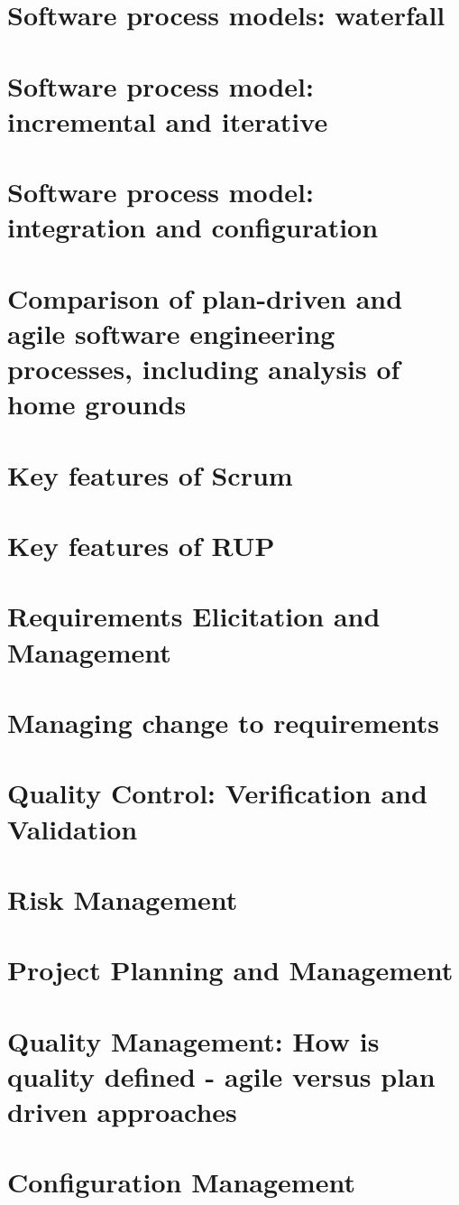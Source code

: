 \documentclass[11pt,a4paper]{article}
\begin{document}
\section{Software process models: waterfall}
\newpage
\section{Software process model: incremental and iterative}
\newpage
\section{Software process model: integration and configuration}
\newpage
\section{Comparison of plan-driven and agile software engineering processes, including analysis of home grounds}
\newpage
\section{Key features of Scrum}
\newpage
\section{Key features of RUP}
\newpage
\section{Requirements Elicitation and Management}
\newpage
\section{Managing change to requirements}
\newpage
\section{Quality Control: Verification and Validation}
\newpage
\section{Risk Management}
\newpage
\section{Project Planning and Management}
\newpage
\section{Quality Management: How is quality defined - agile versus plan driven approaches}
\newpage
\section{Configuration Management}
\newpage
\end{document}
